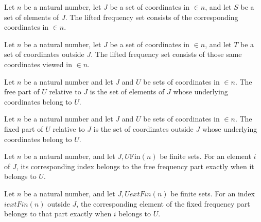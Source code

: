 \begin{definition}
\label{FABL.liftFreeFrequency}
\leanok
Let $n$ be a natural number, let $J$ be a set of coordinates in $\in n$, and let $S$ be
a set of elements of $J$. The lifted frequency set consists of the corresponding
coordinates in $\in n$.
\end{definition}

\begin{definition}
\label{FABL.liftFixedFrequency}
\leanok
{}
Let $n$ be a natural number, let $J$ be a set of coordinates in $\in n$, and let $T$ be
a set of coordinates outside $J$. The lifted frequency set consists of those same
coordinates viewed in $\in n$.
\end{definition}

\begin{definition}
\label{FABL.freeFrequencyPart}
\leanok
Let $n$ be a natural number and let $J$ and $U$ be sets of coordinates in $\in n$. The
free part of $U$ relative to $J$ is the set of elements of $J$ whose underlying
coordinates belong to $U$.
\end{definition}

\begin{definition}
\label{FABL.fixedFrequencyPart}
\leanok
{}
Let $n$ be a natural number and let $J$ and $U$ be sets of coordinates in $\in n$. The
fixed part of $U$ relative to $J$ is the set of coordinates outside $J$ whose underlying
coordinates belong to $U$.
\end{definition}

\begin{theorem}
\label{FABL.mem_freeFrequencyPart}
\leanok
{}
Let $n$ be a natural number, and let $J,U\text{Fin}(n)$ be finite sets. For an element
$i$ of $J$, its corresponding index belongs to the free frequency part exactly when it
belongs to $U$.
\end{theorem}

\begin{theorem}
\label{FABL.mem_fixedFrequencyPart}
\leanok
{}
Let $n$ be a natural number, and let $J,U	ext{Fin}(n)$ be finite sets. For an index
$i	ext{Fin}(n)$ outside $J$, the corresponding element of the fixed frequency part
belongs to that part exactly when $i$ belongs to $U$.
\end{theorem}


